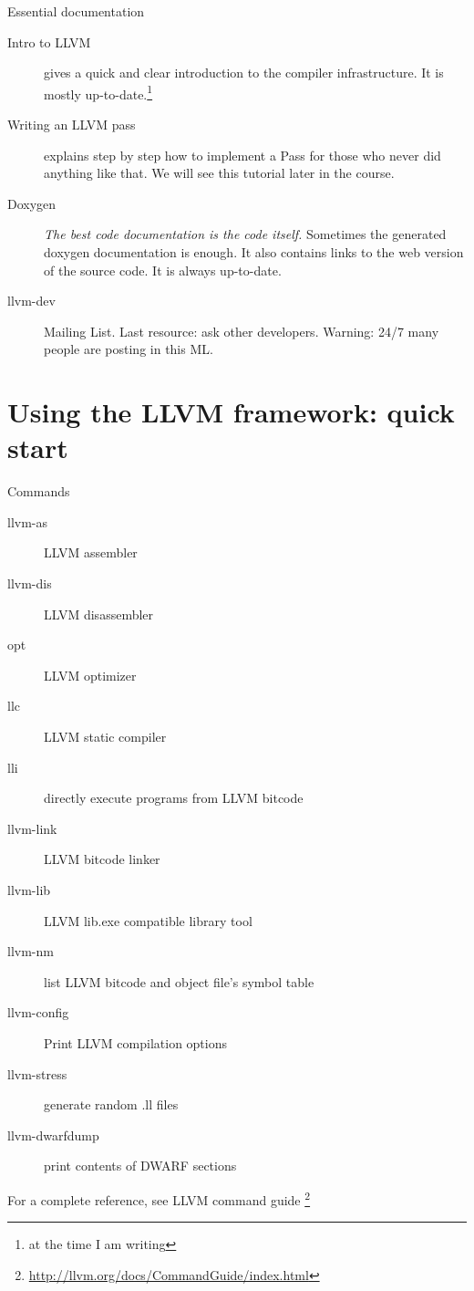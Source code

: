 \documentclass[10pt,mathserif]{beamer}
\begin{document}
\begin{frame}[t]{Essential documentation}
	\begin{description}
		\item[Intro to LLVM] \cite{LOCAL:www/llvmIntro}
		gives a quick and clear introduction to the compiler infrastructure.
		It is mostly up-to-date.\footnote{at the time I am writing}
		\vfill
		\item[Writing an LLVM pass] \cite{LOCAL:www/llvmWritingAPass}
		explains step by step how to implement a Pass
		for those who never did anything like that.
		We will see this tutorial later in the course.
		\vfill
		\item[Doxygen] \cite{LOCAL:www/llvmDoxygen}
		\textit{The best code documentation is the code itself.}
		Sometimes the generated doxygen documentation is enough.
		It also contains links to the web version of the source code.
		It is always up-to-date.
		\vfill
		\item[llvm-dev] Mailing List. Last resource: ask other developers.
		Warning: 24/7 many people are posting in this ML.
	\end{description}
\end{frame}


\section{Using the LLVM framework: quick start}
\begin{frame}{Commands}
	\begin{description}
		\item[llvm-as] LLVM assembler
		\item[llvm-dis] LLVM disassembler
		\item[opt] LLVM optimizer
		\item[llc] LLVM static compiler
		\item[lli] directly execute programs from LLVM bitcode
		\item[llvm-link] LLVM bitcode linker
		\item[llvm-lib] LLVM lib.exe compatible library tool
		\item[llvm-nm] list LLVM bitcode and object file's symbol table
		\item[llvm-config] Print LLVM compilation options
		\item[llvm-stress] generate random .ll files
		\item[llvm-dwarfdump] print contents of DWARF sections
	\end{description}
	\vfill
	For a complete reference, see LLVM command guide \footnote{\url{http://llvm.org/docs/CommandGuide/index.html}}
\end{frame}
\end{document}
